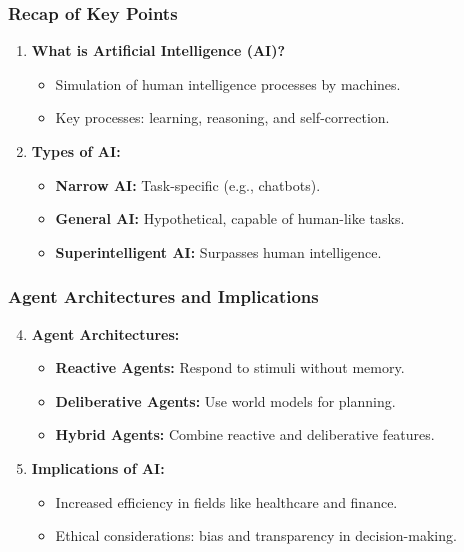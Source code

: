 \documentclass[aspectratio=169]{beamer}
\begin{document}
\begin{frame}[fragile]
    \frametitle{Recap of Key Points}
    \begin{enumerate}
        \item \textbf{What is Artificial Intelligence (AI)?}
        \begin{itemize}
            \item Simulation of human intelligence processes by machines.
            \item Key processes: learning, reasoning, and self-correction.
        \end{itemize}
        
        \item \textbf{Types of AI:}
        \begin{itemize}
            \item \textbf{Narrow AI:} Task-specific (e.g., chatbots).
            \item \textbf{General AI:} Hypothetical, capable of human-like tasks.
            \item \textbf{Superintelligent AI:} Surpasses human intelligence.
        \end{itemize}
    \end{enumerate}
\end{frame}

\begin{frame}[fragile]
    \frametitle{Agent Architectures and Implications}
    \begin{enumerate}
        \setcounter{enumi}{3} %
        \item \textbf{Agent Architectures:}
        \begin{itemize}
            \item \textbf{Reactive Agents:} Respond to stimuli without memory.
            \item \textbf{Deliberative Agents:} Use world models for planning.
            \item \textbf{Hybrid Agents:} Combine reactive and deliberative features.
        \end{itemize}

        \item \textbf{Implications of AI:}
        \begin{itemize}
            \item Increased efficiency in fields like healthcare and finance.
            \item Ethical considerations: bias and transparency in decision-making.
        \end{itemize}
    \end{enumerate}
\end{frame}
\end{document}
